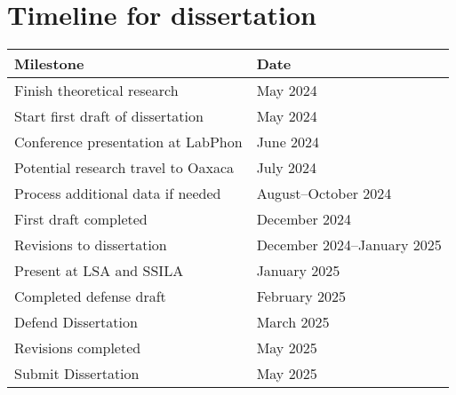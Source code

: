 \documentclass[12pt, letterpaper]{article}
\providecommand{\lsptoprule}{\midrule\toprule}
\providecommand{\lspbottomrule}{\bottomrule\midrule}
\begin{document}
\section{Timeline for dissertation} \label{sec:Timeline}
\begin{table}[!h]
    \centering
    \begin{tabular}{ll}
    \lsptoprule   
    Milestone & Date \\ 
    \hline
    Finish theoretical research & May 2024 \\
    Start first draft of dissertation & May 2024 \\
    Conference presentation at LabPhon & June 2024 \\
    Potential research travel to Oaxaca & July 2024 \\
    Process additional data if needed & August--October 2024 \\
    First draft completed & December 2024  \\
    Revisions to dissertation & December 2024--January 2025 \\
    Present at LSA and SSILA & January 2025 \\
    Completed defense draft & February 2025 \\
    Defend Dissertation & March 2025 \\
    Revisions completed & May 2025 \\
    Submit Dissertation & May 2025 \\ 
    \lspbottomrule
    \end{tabular}
\end{table}


\printbibliography[heading=bibintoc]
\end{document}
